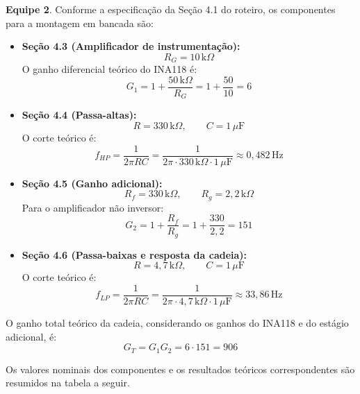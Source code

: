 \documentclass[11pt,a4paper]{article}
\begin{document}
\begin{especbancada}
\textbf{Equipe 2}. Conforme a especificação da Seção 4.1 do roteiro, os componentes para a montagem em bancada são:

\begin{itemize}
    \item \textbf{Seção 4.3 (Amplificador de instrumentação):}
    \[
        R_G=10\,\text{k}\Omega
    \]
    O ganho diferencial teórico do INA118 é:
    \[
        G_1=1+\frac{50\,\text{k}\Omega}{R_G}
        =1+\frac{50}{10}=6
    \]

    \vspace{0.2cm}
    \item \textbf{Seção 4.4 (Passa-altas):}
    \[
        R=330\,\text{k}\Omega,\qquad C=1\,\mu\text{F}
    \]
    O corte teórico é:
    \[
        f_{HP}=\frac{1}{2\pi RC}
        =\frac{1}{2\pi\cdot330\,\text{k}\Omega\cdot1\,\mu\text{F}}
        \approx0{,}482\,\text{Hz}
    \]

    \vspace{0.2cm}
    \item \textbf{Seção 4.5 (Ganho adicional):}
    \[
        R_f=330\,\text{k}\Omega,\qquad R_g=2{,}2\,\text{k}\Omega
    \]
    Para o amplificador não inversor:
    \[
        G_2=1+\frac{R_f}{R_g}
        =1+\frac{330}{2{,}2}=151
    \]

    \vspace{0.2cm}
    \item \textbf{Seção 4.6 (Passa-baixas e resposta da cadeia):}
    \[
        R=4{,}7\,\text{k}\Omega,\qquad C=1\,\mu\text{F}
    \]
    O corte teórico é:
    \[
        f_{LP}=\frac{1}{2\pi RC}
        =\frac{1}{2\pi\cdot4{,}7\,\text{k}\Omega\cdot1\,\mu\text{F}}
        \approx33{,}86\,\text{Hz}
    \]
\end{itemize}

O ganho total teórico da cadeia, considerando os ganhos do INA118 e do estágio adicional, é:
\[
    G_T=G_1G_2=6\cdot151=906
\]
\end{especbancada}

Os valores nominais dos componentes e os resultados teóricos correspondentes são resumidos na tabela a seguir.
\end{document}
